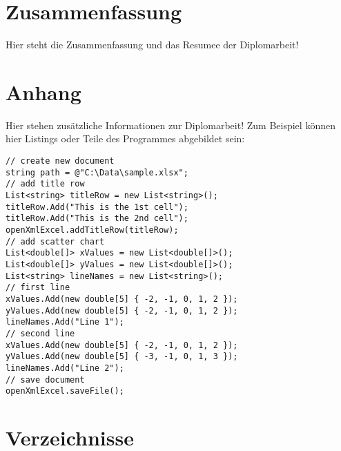 \section{Zusammenfassung}

Hier steht die Zusammenfassung und das Resumee der Diplomarbeit!
\newpage

\section{Anhang}

Hier stehen zusätzliche Informationen zur Diplomarbeit!
Zum Beispiel können hier Listings oder Teile des Programmes abgebildet sein:

\begin{lstlisting}
// create new document
string path = @"C:\Data\sample.xlsx";
// add title row 
List<string> titleRow = new List<string>();
titleRow.Add("This is the 1st cell");
titleRow.Add("This is the 2nd cell");
openXmlExcel.addTitleRow(titleRow);
// add scatter chart
List<double[]> xValues = new List<double[]>();
List<double[]> yValues = new List<double[]>();
List<string> lineNames = new List<string>();
// first line
xValues.Add(new double[5] { -2, -1, 0, 1, 2 });
yValues.Add(new double[5] { -2, -1, 0, 1, 2 });
lineNames.Add("Line 1");
// second line
xValues.Add(new double[5] { -2, -1, 0, 1, 2 });
yValues.Add(new double[5] { -3, -1, 0, 1, 3 });
lineNames.Add("Line 2");
// save document 
openXmlExcel.saveFile();
\end{lstlisting}

\newpage

\section{Verzeichnisse}
\listoffigures 
%

%
